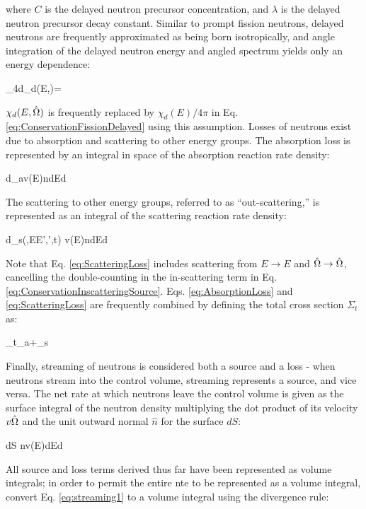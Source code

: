 where \(C\) is the delayed neutron precursor concentration, and \(\lambda\) is the delayed neutron precursor decay constant. Similar to prompt fission neutrons, delayed neutrons are frequently approximated as being born isotropically, and angle integration of the delayed neutron energy and angled spectrum yields only an energy dependence:

\beq
\label{eq:delayed_isotropic}
\int_{4\pi}d\hO \chi_d(E,\hO)=
\eeq

\(\chi_d(E,\hat{\Omega})\) is frequently replaced by \(\chi_d(E)/4\pi\) in Eq. \eqref{eq:ConservationFissionDelayed} using this assumption. Losses of neutrons exist due to absorption and scattering to other energy groups. The absorption loss is represented by an integral in space of the absorption reaction rate density:

\beq
\label{eq:AbsorptionLoss}
\left\lbrack\int d\volume \Sigma_a\seat v(E)n\seat\right\rbrack dEd\hO
\eeq

The scattering to other energy groups, referred to as ``out-scattering,'' is represented as an integral of the scattering reaction rate density:

\beq
\label{eq:ScatteringLoss}
\left\lbrack\int d\volume \Sigma_s(,E\rightarrow E',\hO\rightarrow\hO',t) v(E)n\seat\right\rbrack dEd\hO
\eeq

Note that Eq. \eqref{eq:ScatteringLoss} includes scattering from \(E\rightarrow E\) and \(\hat{\Omega}\rightarrow\hat{\Omega}\), cancelling the double-counting in the in-scattering term in Eq. \eqref{eq:ConservationInscatteringSource}. Eqs. \eqref{eq:AbsorptionLoss} and \eqref{eq:ScatteringLoss} are frequently combined by defining the total cross section \(\Sigma_t\) as:

\beq
\label{eq:TotalSigmaDef}
\Sigma_t\seatout\equiv\Sigma_a\seat+\Sigma_s\seatout
\eeq

Finally, streaming of neutrons is considered both a source and a loss - when neutrons stream into the control volume, streaming represents a source, and vice versa. The net rate at which neutrons leave the control volume is given as the surface integral of the neutron density multiplying the dot product of its velocity \(v\hat{\Omega}\) and the unit outward normal \(\hat{n}\) for the surface \(dS\):

\beq
\label{eq:streaming1}
\left\lbrack\int dS n\seat v(E)\hO\cdot{}\right\rbrack dEd\hO
\eeq

All source and loss terms derived thus far have been represented as volume integrals; in order to permit the entire \gls{nte} to be represented as a volume integral, convert Eq. \eqref{eq:streaming1} to a volume integral using the divergence rule:

